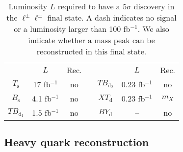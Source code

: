 \documentclass[12pt,a4paper]{article}
\newcommand{\fbin}{fb$^{-1}$}
\newcommand{\Ts}{T_\text{s}}
\newcommand{\Bs}{B_\text{s}}
\newcommand{\TBd}{TB_{\text{d}_1}}
\newcommand{\TBD}{TB_{\text{d}_2}}
\newcommand{\XTd}{XT_\text{d}}
\newcommand{\BYd}{BY_\text{d}}
\begin{document}
\begin{table}[ht]
\begin{center}
\begin{tabular}{ccccccc}
       & $L$       & Rec. & \quad &        & $L$       & Rec. \\[1mm]
$\Ts$  & 17 \fbin  & no   &       & $\TBD$ & 0.23 \fbin & no \\
$\Bs$  & 4.1 \fbin & no   &       & $\XTd$ & 0.23 \fbin & $m_X$ \\
$\TBd$ & 1.5 \fbin & no   &       & $\BYd$ & --        & no
\end{tabular}
\end{center}
\caption{Luminosity $L$ required to have a $5\sigma$ discovery in the $\ell^\pm \ell^\pm$ final state. A dash indicates no signal or a luminosity larger than 100 \fbin.
We also indicate whether a mass peak can be reconstructed in this final state.}
\label{tab:sig-2Q2}
\end{table}




\subsection{Heavy quark reconstruction}
\label{sec:6.2}
\end{document}

